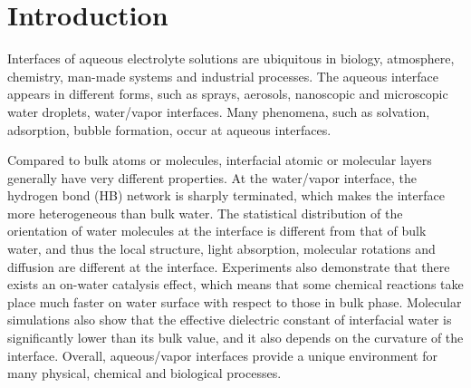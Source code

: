 \chapter{Introduction}\label{CHAPTER_1}
Interfaces of aqueous electrolyte solutions are ubiquitous in biology, atmosphere, chemistry, man-made systems 
and industrial processes\cite{Irwin88,Tobias1999, Benderskii00, 
Asahi2001,Benderskii02,Richmond2002,LiuH2004,
TianCS08,Yamamoto2008, Salmeron2009,ZhangLY2009,
LoNostro2012,Piatkowski2014,Balajka2018}.
The aqueous interface appears in different forms, such as sprays, aerosols, nanoscopic and  microscopic water droplets, water/vapor interfaces.
Many phenomena, such as solvation\cite{Benjamin1996}, adsorption\cite{Chang06}, bubble formation\cite{Craig1993,Craig1993b,Weissenborn1995,Marcelja04,Craig04},
occur at aqueous interfaces\cite{Ball2008,Kuo2004b}. 

Compared to bulk atoms or molecules, interfacial atomic or molecular layers generally have very different properties. 
At the water/vapor interface, the hydrogen bond (HB) network is sharply terminated, which makes the interface more heterogeneous 
than bulk water\cite{singh2013}. 
The statistical distribution of the orientation of water molecules at the interface is different from that of bulk water,
and thus the local structure, light absorption,  molecular rotations and diffusion are different at the interface\cite{Jedlovszky2004}.
Experiments also demonstrate that there exists an on-water catalysis effect, which means that some chemical reactions take place much faster 
on water surface with respect to those in bulk phase\cite{Rideout1980,Narayan2005,Beattie2010}.
Molecular simulations also show that the effective dielectric constant of interfacial water is significantly lower than its bulk value, 
and it also depends on the curvature of the interface\cite{Dinpajooh2016}. 
Overall, aqueous/vapor interfaces provide a unique environment for many physical, chemical and biological processes. 

